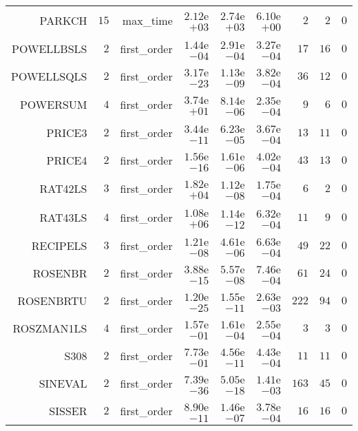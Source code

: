 \begin{longtable}{rrrrrrrrr}
PARKCH & \(    15\) & max\_time & \( 2.12\)e\(+03\) & \( 2.74\)e\(+03\) & \( 6.10\)e\(+00\) & \(     2\) & \(     2\) & \(     0\) \\
POWELLBSLS & \(     2\) & first\_order & \( 1.44\)e\(-04\) & \( 2.91\)e\(-04\) & \( 3.27\)e\(-04\) & \(    17\) & \(    16\) & \(     0\) \\
POWELLSQLS & \(     2\) & first\_order & \( 3.17\)e\(-23\) & \( 1.13\)e\(-09\) & \( 3.82\)e\(-04\) & \(    36\) & \(    12\) & \(     0\) \\
POWERSUM & \(     4\) & first\_order & \( 3.74\)e\(+01\) & \( 8.14\)e\(-06\) & \( 2.35\)e\(-04\) & \(     9\) & \(     6\) & \(     0\) \\
PRICE3 & \(     2\) & first\_order & \( 3.44\)e\(-11\) & \( 6.23\)e\(-05\) & \( 3.67\)e\(-04\) & \(    13\) & \(    11\) & \(     0\) \\
PRICE4 & \(     2\) & first\_order & \( 1.56\)e\(-16\) & \( 1.61\)e\(-06\) & \( 4.02\)e\(-04\) & \(    43\) & \(    13\) & \(     0\) \\
RAT42LS & \(     3\) & first\_order & \( 1.82\)e\(+04\) & \( 1.12\)e\(-08\) & \( 1.75\)e\(-04\) & \(     6\) & \(     2\) & \(     0\) \\
RAT43LS & \(     4\) & first\_order & \( 1.08\)e\(+06\) & \( 1.14\)e\(-12\) & \( 6.32\)e\(-04\) & \(    11\) & \(     9\) & \(     0\) \\
RECIPELS & \(     3\) & first\_order & \( 1.21\)e\(-08\) & \( 4.61\)e\(-06\) & \( 6.63\)e\(-04\) & \(    49\) & \(    22\) & \(     0\) \\
ROSENBR & \(     2\) & first\_order & \( 3.88\)e\(-15\) & \( 5.57\)e\(-08\) & \( 7.46\)e\(-04\) & \(    61\) & \(    24\) & \(     0\) \\
ROSENBRTU & \(     2\) & first\_order & \( 1.20\)e\(-25\) & \( 1.55\)e\(-11\) & \( 2.63\)e\(-03\) & \(   222\) & \(    94\) & \(     0\) \\
ROSZMAN1LS & \(     4\) & first\_order & \( 1.57\)e\(-01\) & \( 1.61\)e\(-04\) & \( 2.55\)e\(-04\) & \(     3\) & \(     3\) & \(     0\) \\
S308 & \(     2\) & first\_order & \( 7.73\)e\(-01\) & \( 4.56\)e\(-11\) & \( 4.43\)e\(-04\) & \(    11\) & \(    11\) & \(     0\) \\
SINEVAL & \(     2\) & first\_order & \( 7.39\)e\(-36\) & \( 5.05\)e\(-18\) & \( 1.41\)e\(-03\) & \(   163\) & \(    45\) & \(     0\) \\
SISSER & \(     2\) & first\_order & \( 8.90\)e\(-11\) & \( 1.46\)e\(-07\) & \( 3.78\)e\(-04\) & \(    16\) & \(    16\) & \(     0\) \\

\end{longtable}
